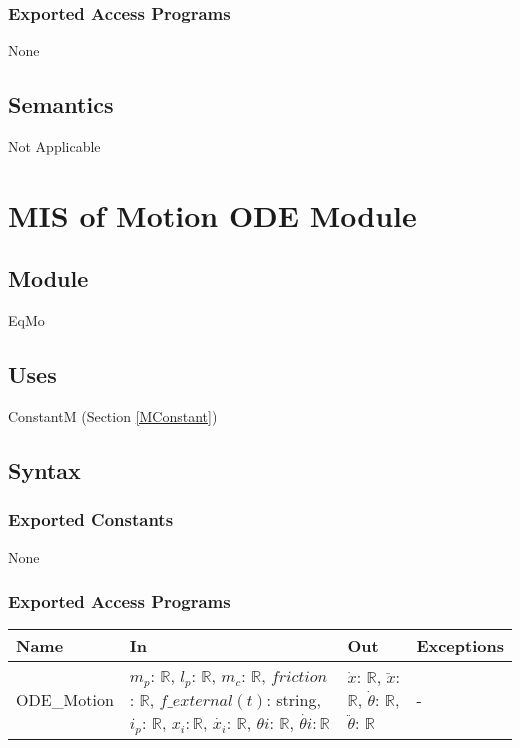 \documentclass[12pt, titlepage]{article}
\begin{document}
\subsubsection{Exported Access Programs}
None
\subsection{Semantics}

Not Applicable



\newpage
\section{MIS of Motion ODE  Module  \label{MC} }


\subsection{Module}

EqMo

\subsection{Uses}

ConstantM (Section \ref{MConstant})


\subsection{Syntax}

\subsubsection{Exported Constants}
None
\subsubsection{Exported Access Programs}

\begin{center}
\begin{tabular}{p{3cm} p{6cm} p{4cm} p{3cm}}
\hline
\textbf{Name} & \textbf{In} & \textbf{Out} & \textbf{Exceptions} \\
\hline
ODE\_Motion & $ m_p$: $\mathbb{R}$, $l_p$: $\mathbb{R}$, $m_c$: $\mathbb{R}$, $friction$: $\mathbb{R}$, $f\_external(t)$: string, $i_p$: $\mathbb{R}$, $x_i$$: \mathbb{R}$, $\dot{x_i}$: $\mathbb{R}$, $\theta{i}$: $\mathbb{R}$, $\dot{\theta{i}}$$: \mathbb{R}$ & $\dot{x}$: $\mathbb{R}$, $\ddot{x}$: $\mathbb{R}$, $\dot{\theta}$: $\mathbb{R}$, $\ddot{\theta}$: $\mathbb{R}$  & - \\
\end{tabular}
\end{center}
\end{document}
